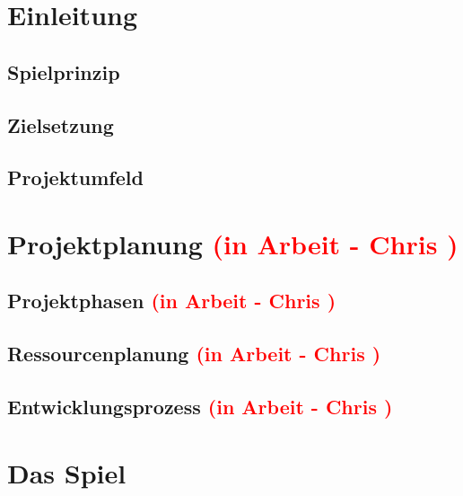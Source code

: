 \documentclass{article}
\begin{document}

%

\newpage

\tableofcontents

\newpage
	
\section{Einleitung}

\vspace{2cm}
\subsection{Spielprinzip}

\vspace{2cm}
\subsection{Zielsetzung}

\vspace{2cm}
\subsection{Projektumfeld}


\newpage
\section{Projektplanung \textcolor{red}{(in Arbeit - Chris )}}


\vspace{2cm}
\subsection{Projektphasen  \textcolor{red}{(in Arbeit - Chris )}}

\vspace{2cm}
\subsection{Ressourcenplanung  \textcolor{red}{(in Arbeit - Chris )}}

\vspace{2cm}
\subsection{Entwicklungsprozess  \textcolor{red}{(in Arbeit - Chris )}}

\newpage
\section{Das Spiel}
\end{document}

